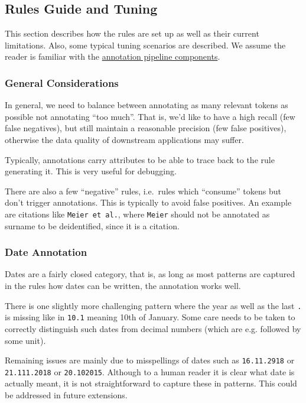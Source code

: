 \subsection{Rules Guide and Tuning}\label{rules-guide-and-tuning}

This section describes how the rules are set up as well as their current
limitations. Also, some typical tuning scenarios are described. We
assume the reader is familiar with the \href{components.md}{annotation
pipeline components}.

\subsubsection{General Considerations}\label{general-considerations}

In general, we need to balance between annotating as many relevant
tokens as possible not annotating ``too much''. That is, we'd like to
have a high recall (few false negatives), but still maintain a
reasonable precision (few false positives), otherwise the data quality
of downstream applications may suffer.

Typically, annotations carry attributes to be able to trace back to the
rule generating it. This is very useful for debugging.

There are also a few ``negative'' rules, i.e.~rules which ``consume''
tokens but don't trigger annotations. This is typically to avoid false
positives. An example are citations like \texttt{Meier\ et\ al.}, where
\texttt{Meier} should not be annotated as surname to be deidentified,
since it is a citation.

\subsubsection{Date Annotation}\label{date-annotation}

Dates are a fairly closed category, that is, as long as most patterns
are captured in the rules how dates can be written, the annotation works
well.

There is one slightly more challenging pattern where the year as well as
the last \texttt{.} is missing like in \texttt{10.1} meaning 10th of
January. Some care needs to be taken to correctly distinguish such dates
from decimal numbers (which are e.g. followed by some unit).

Remaining issues are mainly due to misspellings of dates such as
\texttt{16.11.2918} or \texttt{21.111.2018} or \texttt{20.102015}.
Although to a human reader it is clear what date is actually meant, it
is not straightforward to capture these in patterns. This could be
addressed in future extensions.

